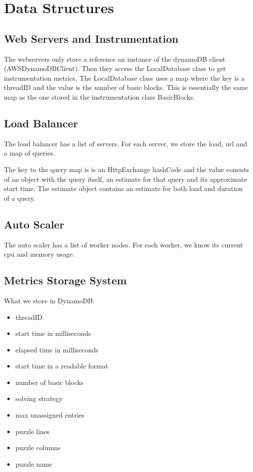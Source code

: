 \documentclass[10pt,twocolumn]{article}
\begin{document}
\section{Data Structures}

\subsection*{Web Servers and Instrumentation}

The webservers only store a reference an instance of the dynamoDB client (AWSDynamoDBClient).
Then they access the LocalDatabase class to get instrumentation metrics. The LocalDatabase class uses a map where the key is a threadID and the value
is the number of basic blocks. This is essentially the same map as the one stored in the instrumentation class BasicBlocks.

\subsection*{Load Balancer}

The load balancer has a list of servers. For each server, we store the load, url and a map of queries.

The key to the query map is is an HttpExchange hashCode and the value consists of an object with the query itself, an estimate for that query and its approximate start time.
The estimate object contains an estimate for both load and duration of a query.

\subsection*{Auto Scaler}

The auto scaler has a list of worker nodes. For each worker, we know its current cpu and memory usage.

\subsection*{Metrics Storage System}

What we store in DynamoDB:

\begin{itemize}
    \setlength\itemsep{0em}
    \item threadID
    \item start time in milliseconds
    \item elapsed time in milliseconds
    \item start time in a readable format
    \item number of basic blocks
    \item solving strategy
    \item max unassigned entries
    \item puzzle lines
    \item puzzle columns
    \item puzzle name
\end{itemize}
\end{document}
